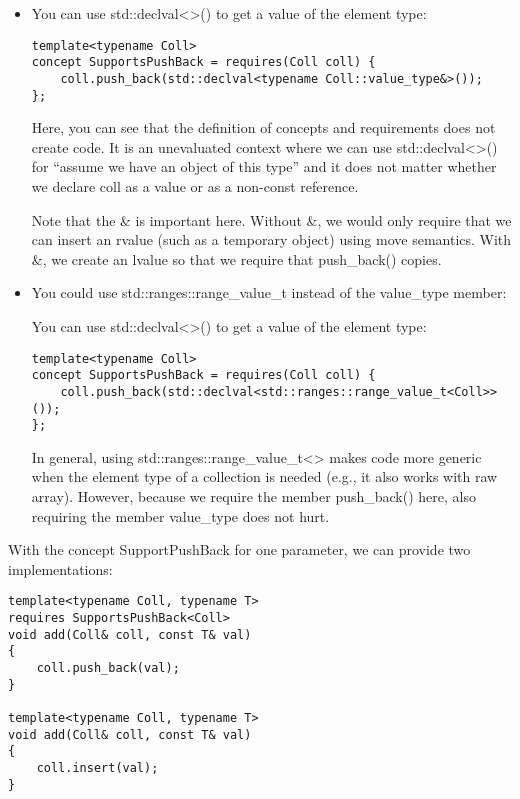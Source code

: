 \begin{itemize}
\item
You can use std::declval<>() to get a value of the element type:

\begin{lstlisting}[style=styleCXX]
template<typename Coll>
concept SupportsPushBack = requires(Coll coll) {
	coll.push_back(std::declval<typename Coll::value_type&>());
};
\end{lstlisting}

Here, you can see that the definition of concepts and requirements does not create code. It is an unevaluated context where we can use std::declval<>() for “assume we have an object of this type” and it does not matter whether we declare coll as a value or as a non-const reference.

Note that the \& is important here. Without \&, we would only require that we can insert an rvalue (such as a temporary object) using move semantics. With \&, we create an lvalue so that we require that push\_back() copies.

\item
You could use std::ranges::range\_value\_t instead of the value\_type member:

You can use std::declval<>() to get a value of the element type:

\begin{lstlisting}[style=styleCXX]
template<typename Coll>
concept SupportsPushBack = requires(Coll coll) {
	coll.push_back(std::declval<std::ranges::range_value_t<Coll>>());
};
\end{lstlisting}

In general, using std::ranges::range\_value\_t<> makes code more generic when the element type of a collection is needed (e.g., it also works with raw array). However, because we require the member push\_back() here, also requiring the member value\_type does not hurt.

\end{itemize}

With the concept SupportPushBack for one parameter, we can provide two implementations:

\begin{lstlisting}[style=styleCXX]
template<typename Coll, typename T>
requires SupportsPushBack<Coll>
void add(Coll& coll, const T& val)
{
	coll.push_back(val);
}

template<typename Coll, typename T>
void add(Coll& coll, const T& val)
{
	coll.insert(val);
}
\end{lstlisting}

